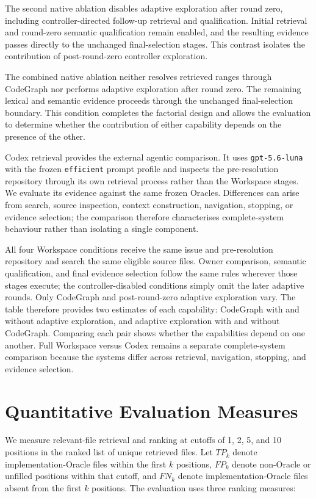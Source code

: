 The second native ablation disables adaptive exploration after round zero, including controller-directed follow-up retrieval and qualification. Initial retrieval and round-zero semantic qualification remain enabled, and the resulting evidence passes directly to the unchanged final-selection stages. This contrast isolates the contribution of post-round-zero controller exploration.

The combined native ablation neither resolves retrieved ranges through CodeGraph nor performs adaptive exploration after round zero. The remaining lexical and semantic evidence proceeds through the unchanged final-selection boundary. This condition completes the factorial design and allows the evaluation to determine whether the contribution of either capability depends on the presence of the other.

Codex retrieval provides the external agentic comparison. It uses \texttt{gpt-5.6-luna} with the frozen \texttt{efficient} prompt profile and inspects the pre-resolution repository through its own retrieval process rather than the Workspace stages. We evaluate its evidence against the same frozen Oracles. Differences can arise from search, source inspection, context construction, navigation, stopping, or evidence selection; the comparison therefore characterises complete-system behaviour rather than isolating a single component.

All four Workspace conditions receive the same issue and pre-resolution repository and search the same eligible source files. Owner comparison, semantic qualification, and final evidence selection follow the same rules wherever those stages execute; the controller-disabled conditions simply omit the later adaptive rounds. Only CodeGraph and post-round-zero adaptive exploration vary. The table therefore provides two estimates of each capability: CodeGraph with and without adaptive exploration, and adaptive exploration with and without CodeGraph. Comparing each pair shows whether the capabilities depend on one another. Full Workspace versus Codex remains a separate complete-system comparison because the systems differ across retrieval, navigation, stopping, and evidence selection.

\section{Quantitative Evaluation Measures}\label{sec:quantitative-evaluation-measures}

We measure relevant-file retrieval and ranking at cutoffs of 1, 2, 5, and 10 positions in the ranked list of unique retrieved files. Let $TP_k$ denote implementation-Oracle files within the first $k$ positions, $FP_k$ denote non-Oracle or unfilled positions within that cutoff, and $FN_k$ denote implementation-Oracle files absent from the first $k$ positions. The evaluation uses three ranking measures:

